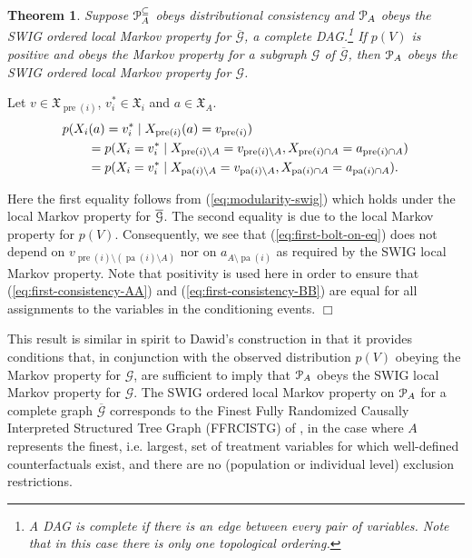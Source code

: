\documentclass[11pt]{article}
\DeclareMathOperator{\pa}{pa}
\DeclareMathOperator{\pre}{pre}
\newtheorem{theorem}{Theorem}
\newcommand{\G}{{\mathscr G}}
\begin{document}
{\begin{theorem}\label{thm:top-and-bottom-swig}
Suppose ${\cal P}^{\subseteq}_A$ obeys distributional consistency and ${\cal P}_A$  obeys the 
SWIG ordered local Markov property for $\overline{\G}$, a complete DAG.\footnote{A DAG is complete if there is an edge between every pair of variables. Note that in this case
there is only one topological ordering.} 
If $p(V)$ is positive and obeys the Markov property for a subgraph $\G$ of $\overline{\G}$, then 
${\cal P}_A$ obeys the SWIG ordered local Markov property for $\G$.
\end{theorem}

 Let $v \in \mathfrak{X}_{\pre(i)}$, $v_i^* \in \mathfrak{X}_{i}$ and $a \in \mathfrak{X}_A$.
\begin{align}
\MoveEqLeft{p(X_i({ a})=v^*_i \mid X_{\pre(i)}({ a})= v_{\pre(i)})}\label{eq:first-bolt-on-eq}\\
&= p(X_i=v^*_i \mid  X_{\pre(i) \setminus A} = v_{\pre(i) \setminus A}, X_{\pre(i)\cap A}=a_{\pre(i)\cap A})\label{eq:first-consistency-AA}\\
&= p(X_i=v^*_i \mid  X_{\pa(i) \setminus A} = v_{\pa(i) \setminus A}, X_{\pa(i)\cap A}=a_{\pa(i)\cap A}).\label{eq:first-consistency-BB}
\end{align}

Here the first equality follows from (\ref{eq:modularity-swig}) which holds under the local Markov property for $\overline{\cal G}$.
The second equality is due to the local Markov property for $p(V)$. Consequently, we see that (\ref{eq:first-bolt-on-eq})
does not depend on $v_{\pre(i) \setminus (\pa(i) \setminus A)}$ nor on  $a_{A \setminus \pa(i)}$
 as required by the SWIG local Markov property. Note that positivity is used here in order to ensure that (\ref{eq:first-consistency-AA}) and
 (\ref{eq:first-consistency-BB}) are equal for all assignments to the variables in the conditioning events.
\hfill$\Box$
\medskip


This result is similar in spirit to Dawid's construction in that it provides conditions that, in conjunction with the observed distribution $p(V)$ obeying the Markov property for $\G$, are sufficient to imply that ${\cal P}_A$ obeys the SWIG local Markov property for $\G$. The SWIG ordered local Markov property on ${\cal P}_A$ for a complete graph $\overline{\G}$ corresponds to the Finest Fully Randomized Causally Interpreted Structured Tree Graph (FFRCISTG) of \citet{robins86new}, in the case where $A$ represents the finest, i.e. largest, set of treatment variables for which well-defined counterfactuals exist, and there are no (population or individual level) exclusion restrictions.

}
\end{document}

